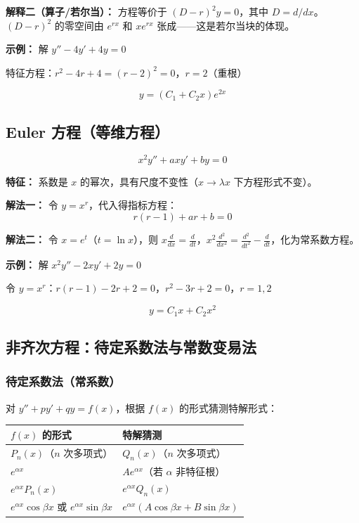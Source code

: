 \textbf{解释二（算子/若尔当）：} 方程等价于 $(D - r)^2 y = 0$，其中 $D = d/dx$。$(D-r)^2$ 的零空间由 $e^{rx}$ 和 $xe^{rx}$ 张成——这是若尔当块的体现。

\textbf{示例：} 解 $y'' - 4y' + 4y = 0$

特征方程：$r^2 - 4r + 4 = (r-2)^2 = 0$，$r = 2$（重根）

\[
\boxed{y = (C_1 + C_2 x)e^{2x}}
\]

\subsection{Euler 方程（等维方程）}

\[
x^2 y'' + axy' + by = 0
\]

\textbf{特征：} 系数是 $x$ 的幂次，具有尺度不变性（$x \to \lambda x$ 下方程形式不变）。

\textbf{解法一：} 令 $y = x^r$，代入得指标方程：
\[
r(r-1) + ar + b = 0
\]

\textbf{解法二：} 令 $x = e^t$（$t = \ln x$），则 $x\frac{d}{dx} = \frac{d}{dt}$，$x^2\frac{d^2}{dx^2} = \frac{d^2}{dt^2} - \frac{d}{dt}$，化为常系数方程。

\textbf{示例：} 解 $x^2 y'' - 2xy' + 2y = 0$

令 $y = x^r$：$r(r-1) - 2r + 2 = 0$，$r^2 - 3r + 2 = 0$，$r = 1, 2$

\[
\boxed{y = C_1 x + C_2 x^2}
\]

\subsection{非齐次方程：待定系数法与常数变易法}

\subsubsection{待定系数法（常系数）}

对 $y'' + py' + qy = f(x)$，根据 $f(x)$ 的形式猜测特解形式：

\begin{center}
\begin{tabular}{L{4cm}L{5cm}}
\toprule
\textbf{$f(x)$ 的形式} & \textbf{特解猜测} \\
\midrule
$P_n(x)$（$n$ 次多项式） & $Q_n(x)$（$n$ 次多项式） \\
$e^{\alpha x}$ & $Ae^{\alpha x}$（若 $\alpha$ 非特征根） \\
$e^{\alpha x}P_n(x)$ & $e^{\alpha x}Q_n(x)$ \\
$e^{\alpha x}\cos\beta x$ 或 $e^{\alpha x}\sin\beta x$ & $e^{\alpha x}(A\cos\beta x + B\sin\beta x)$ \\
\bottomrule
\end{tabular}
\end{center}


